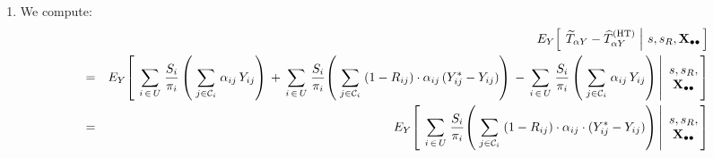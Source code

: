 \begin{enumerate}
\begin{eqnarray*}
{                \left.
                \widetilde{T}_{\alpha Y} \overset{{\color{white}.}}{-} \widehat{T}^{\textnormal{(HT)}}_{\alpha Y}
                \;\right\vert\,
                s,s_{R},\Xobs
                \,\right]}
            \;\right),
    \end{eqnarray*}
    as required.
\item
    We compute:
    \begin{eqnarray*}
    &&
        E_{Y}\!\left[\;
            \left.
            \widetilde{T}_{\alpha Y} \overset{{\color{white}.}}{-} \widehat{T}^{\textnormal{(HT)}}_{\alpha Y}
            \;\right\vert\,
            s,s_{R},\Xobs
            \,\right]
    \\
    & = &
        E_{Y}\!\left[\;
            \left.
            \underset{i\,\in\,U}{\sum}\;
                \dfrac{S_{i}}{\pi_{i}}
                \left(\;
                    \underset{j \in \mathcal{C}_{i}}{\sum}\;\alpha_{ij}\,Y_{ij}
                    \right)
            \, + \,
            \underset{i\,\in\,U}{\sum}\;
                \dfrac{S_{i}}{\pi_{i}}\!
                \left(\;
                    \underset{j \in \mathcal{C}_{i}}{\sum}\;
                    (1 \overset{{\color{white}.}}{-} R_{ij})
                    \cdot
                    \alpha_{ij}\,
                    (Y^{*}_{ij} \overset{{\color{white}.}}{-} Y_{ij})
                    \right)
            \, - \,
            \underset{i\,\in\,U}{\sum}\;
                \dfrac{S_{i}}{\pi_{i}}
                \left(\;
                    \underset{j \in \mathcal{C}_{i}}{\sum}\;\alpha_{ij}\,Y_{ij}
                    \right)
            \,\right\vert\!
            \begin{array}{c} s,s_{R}, \\ \Xobs \end{array}
            \!\!\right]
    \\
    & = &
        E_{Y}\!\left[\;
            \left.
            \underset{i\,\in\,U}{\sum}\;
                \dfrac{S_{i}}{\pi_{i}}\!
                \left(\;
                    \underset{j \in \mathcal{C}_{i}}{\sum}\;
                    (1 \overset{{\color{white}.}}{-} R_{ij})
                    \cdot
                    \alpha_{ij}
                    \cdot
                    (Y^{*}_{ij} \overset{{\color{white}.}}{-} Y_{ij})
                    \right)
            \,\right\vert\!
            \begin{array}{c} s,s_{R}, \\ \Xobs \end{array}
            \!\!\right]

\end{eqnarray*}
\end{enumerate}
